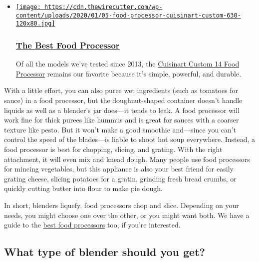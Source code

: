 \begin{itemize}
\item
  \href{https://www.nytimes3xbfgragh.onion/wirecutter/reviews/the-best-food-processor/}{\texttt{[image: https://cdn.thewirecutter.com/wp-content/uploads/2020/01/05-food-processor-cuisinart-custom-630-120x80.jpg]}}

  \hypertarget{the-best-food-processor}{%
  \subsubsection{\texorpdfstring{\href{https://www.nytimes3xbfgragh.onion/wirecutter/reviews/the-best-food-processor/}{The
  Best Food
  Processor}}{The Best Food Processor}}\label{the-best-food-processor}}

  Of all the models we've tested since 2013, the
  \href{https://wclink.co/link/13566/152745/4/108512/?merchant=Amazon}{Cuisinart
  Custom 14 Food Processor} remains our favorite because it's simple,
  powerful, and durable.
\end{itemize}

With a little effort, you can also puree wet ingredients (such as
tomatoes for sauce) in a food processor, but the doughnut-shaped
container doesn't handle liquids as well as a blender's jar does---it
tends to leak. A food processor will work fine for thick purees like
hummus and is great for sauces with a coarser texture like pesto. But it
won't make a good smoothie and---since you can't control the speed of
the blades---is liable to shoot hot soup everywhere. Instead, a food
processor is best for chopping, slicing, and grating. With the right
attachment, it will even mix and knead dough. Many people use food
processors for mincing vegetables, but this appliance is also your best
friend for easily grating cheese, slicing potatoes for a gratin,
grinding fresh bread crumbs, or quickly cutting butter into flour to
make pie dough.

In short, blenders liquefy, food processors chop and slice. Depending on
your needs, you might choose one over the other, or you might want both.
We have a guide to the
\href{https://www.nytimes3xbfgragh.onion/wirecutter/reviews/the-best-food-processor/}{best
food processors} too, if you're interested.

\hypertarget{what-type-of-blender-should-you-get}{%
\subsection{What type of blender should you
get?}\label{what-type-of-blender-should-you-get}}

